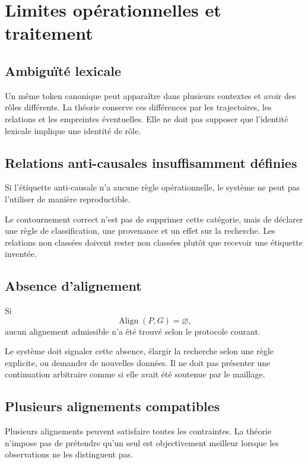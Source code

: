 \documentclass[11pt,a4paper]{report}
\theoremstyle{definition}
\theoremstyle{plain}
\theoremstyle{remark}
\newcommand{\Align}{\operatorname{Align}}
\begin{document}
\section{Limites opérationnelles et traitement}

\subsection{Ambiguïté lexicale}

Un même token canonique peut apparaître dans plusieurs contextes
et avoir des rôles différents. La théorie conserve ces différences
par les trajectoires, les relations et les empreintes éventuelles.
Elle ne doit pas supposer que l'identité lexicale implique une
identité de rôle.

\subsection{Relations anti-causales insuffisamment définies}

Si l'étiquette anti-causale n'a aucune règle opérationnelle,
le système ne peut pas l'utiliser de manière reproductible.

Le contournement correct n'est pas de supprimer cette catégorie,
mais de déclarer une règle de classification, une provenance et
un effet sur la recherche. Les relations non classées doivent
rester non classées plutôt que recevoir une étiquette inventée.

\subsection{Absence d'alignement}

Si
\[
\Align(P,G)=\varnothing,
\]
aucun alignement admissible n'a été trouvé selon le protocole
courant.

Le système doit signaler cette absence, élargir la recherche
selon une règle explicite, ou demander de nouvelles données.
Il ne doit pas présenter une continuation arbitraire comme
si elle avait été soutenue par le maillage.

\subsection{Plusieurs alignements compatibles}

Plusieurs alignements peuvent satisfaire toutes les contraintes.
La théorie n'impose pas de prétendre qu'un seul est objectivement
meilleur lorsque les observations ne les distinguent pas.
\end{document}
